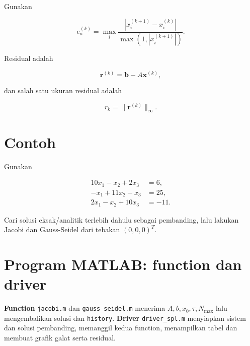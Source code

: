 Gunakan

\begin{equation}
e_a^{(k)}
=
\max_i
\frac{|x_i^{(k+1)}-x_i^{(k)}|}
{\max(1,|x_i^{(k+1)}|)}.
\end{equation}

Residual adalah

\begin{equation}
\mathbf{r}^{(k)}
=
\mathbf{b}-A\mathbf{x}^{(k)},
\end{equation}

dan salah satu ukuran residual adalah

\begin{equation}
r_k=\|\mathbf{r}^{(k)}\|_\infty.
\end{equation}

\section{Contoh}

Gunakan

\begin{align}
10x_1-x_2+2x_3&=6,\\
-x_1+11x_2-x_3&=25,\\
2x_1-x_2+10x_3&=-11.
\end{align}

Cari solusi eksak/analitik terlebih dahulu sebagai pembanding, lalu lakukan Jacobi dan Gauss-Seidel dari tebakan $(0,0,0)^T$.

\section{Program MATLAB: function dan driver}
\textbf{Function} \texttt{jacobi.m} dan \texttt{gauss\_seidel.m} menerima $A,b,x_0,\tau,N_{\max}$ lalu mengembalikan solusi dan \texttt{history}. \textbf{Driver} \texttt{driver\_spl.m} menyiapkan sistem dan solusi pembanding, memanggil kedua function, menampilkan tabel dan membuat grafik galat serta residual.






